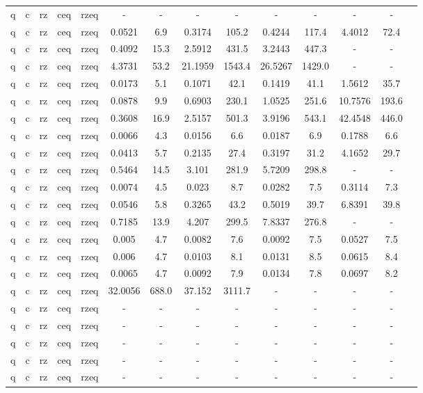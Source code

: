 \begin{table}[htb]
{\begin{tabular}{|c|c|c|c|c|c|c|c|c|c|c|c|c|c|}
q & c & rz & ceq & rzeq & - & - & - & - & - & - & - & - \\ 
q & c & rz & ceq & rzeq & 0.0521 & 6.9 & 0.3174 & 105.2 & 0.4244 & 117.4 & 4.4012 & 72.4 \\ 
q & c & rz & ceq & rzeq & 0.4092 & 15.3 & 2.5912 & 431.5 & 3.2443 & 447.3 & - & - \\ 
q & c & rz & ceq & rzeq & 4.3731 & 53.2 & 21.1959 & 1543.4 & 26.5267 & 1429.0 & - & - \\ 
q & c & rz & ceq & rzeq & 0.0173 & 5.1 & 0.1071 & 42.1 & 0.1419 & 41.1 & 1.5612 & 35.7 \\ 
q & c & rz & ceq & rzeq & 0.0878 & 9.9 & 0.6903 & 230.1 & 1.0525 & 251.6 & 10.7576 & 193.6 \\ 
q & c & rz & ceq & rzeq & 0.3608 & 16.9 & 2.5157 & 501.3 & 3.9196 & 543.1 & 42.4548 & 446.0 \\ 
q & c & rz & ceq & rzeq & 0.0066 & 4.3 & 0.0156 & 6.6 & 0.0187 & 6.9 & 0.1788 & 6.6 \\ 
q & c & rz & ceq & rzeq & 0.0413 & 5.7 & 0.2135 & 27.4 & 0.3197 & 31.2 & 4.1652 & 29.7 \\ 
q & c & rz & ceq & rzeq & 0.5464 & 14.5 & 3.101 & 281.9 & 5.7209 & 298.8 & - & - \\ 
q & c & rz & ceq & rzeq & 0.0074 & 4.5 & 0.023 & 8.7 & 0.0282 & 7.5 & 0.3114 & 7.3 \\ 
q & c & rz & ceq & rzeq & 0.0546 & 5.8 & 0.3265 & 43.2 & 0.5019 & 39.7 & 6.8391 & 39.8 \\ 
q & c & rz & ceq & rzeq & 0.7185 & 13.9 & 4.207 & 299.5 & 7.8337 & 276.8 & - & - \\ 
q & c & rz & ceq & rzeq & 0.005 & 4.7 & 0.0082 & 7.6 & 0.0092 & 7.5 & 0.0527 & 7.5 \\ 
q & c & rz & ceq & rzeq & 0.006 & 4.7 & 0.0103 & 8.1 & 0.0131 & 8.5 & 0.0615 & 8.4 \\ 
q & c & rz & ceq & rzeq & 0.0065 & 4.7 & 0.0092 & 7.9 & 0.0134 & 7.8 & 0.0697 & 8.2 \\ 
q & c & rz & ceq & rzeq & 32.0056 & 688.0 & 37.152 & 3111.7 & - & - & - & - \\ 
q & c & rz & ceq & rzeq & - & - & - & - & - & - & - & - \\ 
q & c & rz & ceq & rzeq & - & - & - & - & - & - & - & - \\ 
q & c & rz & ceq & rzeq & - & - & - & - & - & - & - & - \\ 
q & c & rz & ceq & rzeq & - & - & - & - & - & - & - & - \\ 
q & c & rz & ceq & rzeq & - & - & - & - & - & - & - & - \\ 

\end{tabular}}
\end{table}
